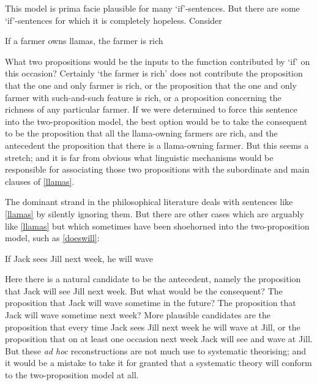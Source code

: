 \documentclass[If.tex]{subfiles}
\begin{document}
This model is prima facie plausible for many ‘if’-sentences. But there are some ‘if’-sentences for which it is completely hopeless. Consider
\begin{prop}
	\nitem \label{llamas} 
	If a farmer owns llamas, the farmer is rich
\end{prop}
What two propositions would be the inputs to the function contributed by ‘if’ on this occasion?  Certainly ‘the farmer is rich’ does not contribute the proposition that the one and only farmer is rich, or the proposition that the one and only farmer with such-and-such feature is rich, or a proposition concerning the richness of any particular farmer. If we were determined to force this sentence into the two-proposition model, the best option would be to take the consequent to be the proposition that all the llama-owning farmers are rich, and the antecedent the proposition that there is a llama-owning farmer. But this seems a stretch; and it is far from obvious what linguistic mechanisms would be responsible for associating those two propositions with the subordinate and main clauses of \ref{llamas}.  

The dominant strand in the philosophical literature deals with sentences like \ref{llamas} by silently ignoring them. But there are other cases which are arguably like \ref{llamas} but which sometimes have been shoehorned into the two-proposition model, such as \ref{doeswill}:
\begin{prop}
	\nitem \label{doeswill} 
	If Jack sees Jill next week, he will wave
\end{prop}
Here there is a natural candidate to be the antecedent, namely the proposition that Jack will see Jill next week. But what would be the consequent? The proposition that Jack will wave sometime in the future? The proposition that Jack will wave sometime next week? More plausible candidates are the proposition that every time Jack sees Jill next week he will wave at Jill, or the proposition that on at least one occasion next week Jack will see and wave at Jill. But these \emph{ad hoc} reconstructions are not much use to systematic theorising; and it would be a mistake to take it for granted that a systematic theory will conform to the two-proposition model at all.
\end{document}
